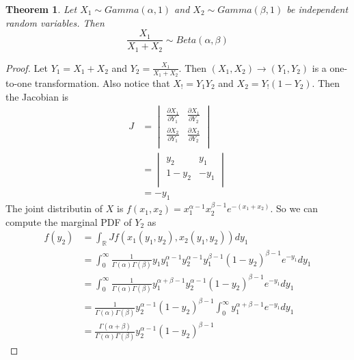 \documentclass{article}
\newtheorem{theorem}{Theorem}
\theoremstyle{definition}\newtheorem{definition}{DEF}
\theoremstyle{definition}\newtheorem{example}{Ex}
\theoremstyle{lemma}\newtheorem{lemma}{Lemma}
\theoremstyle{corrolary}\newtheorem{corrolary}{Cor}
\begin{document}
\begin{theorem}
Let $X_1\sim Gamma(\alpha, 1)$ and $X_2\sim Gamma(\beta, 1)$  be independent random variables.
Then
\begin{equation}
\frac{X_1}{X_1 + X_2} \sim Beta(\alpha, \beta)
\end{equation}
\end{theorem}
\begin{proof}
Let $Y_1=X_1 + X_2$ and $Y_2 = \frac{X_1}{X_1 + X_2}$.
Then $(X_1, X_2)\rightarrow (Y_1, Y_2)$ is a one-to-one transformation.
Also notice that $X_!=Y_1 Y_2$ and $X_2 = Y_!(1-Y_2)$.
Then the Jacobian is
\begin{align*}
J&=
\begin{vmatrix}
\frac{\partial X_1}{\partial Y_1} & \frac{\partial X_1}{\partial Y_2}\\
\frac{\partial X_2}{\partial Y_1} & \frac{\partial X_2}{\partial Y_2}\\
\end{vmatrix}\\
&=
\begin{vmatrix}
y_2 & y_1\\
1-y_2 & -y_1\\
\end{vmatrix}\\
&=-y_1
\end{align*}
The joint distributin of $X$ is $f(x_1, x_2)=x_1^{\alpha-1}x_2^{\beta-1}e^{-(x_1+x_2)}$.
So we can compute the marginal PDF of $Y_2$ as
\begin{align*}
f(y_2)&=\int_\mathbb{R} Jf(x_1(y_1, y_2), x_2(y_1, y_2))dy_1\\
&=\int_0^\infty \frac{1}{\Gamma(\alpha)\Gamma(\beta)} y_1 y_1^{\alpha-1} y_2^{\alpha-1} y_1^{\beta -1} (1-y_2)^{\beta-1} e^{-y_1}dy_1\\
&=\int_0^\infty \frac{1}{\Gamma(\alpha)\Gamma(\beta)} y_1^{\alpha + \beta -1} y_2^{\alpha -1} (1-y_2)^{\beta -1} e^{-y_1}dy_1\\
&=\frac{1}{\Gamma(\alpha)\Gamma(\beta)} y_2^{\alpha-1} (1-y_2)^{\beta-1} \int_0^\infty y_1^{\alpha + \beta -1}e^{-y_1}dy_1\\
&=\frac{\Gamma(\alpha + \beta)}{\Gamma(\alpha)\Gamma(\beta)} y_2^{\alpha-1} (1-y_2)^{\beta-1}
\end{align*}
\end{proof}
\end{document}
